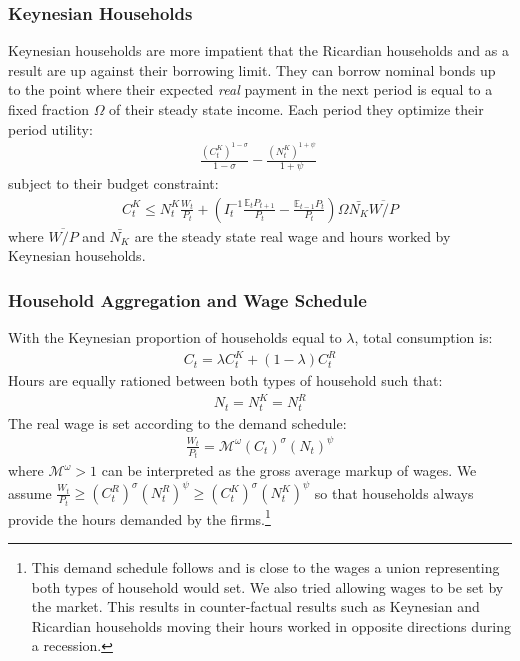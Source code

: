 \documentclass[12pt,a4paper]{article}
\begin{document}
\subsubsection{Keynesian Households}
Keynesian households are more impatient that the Ricardian households and as a result are up against their borrowing limit. They can borrow nominal bonds up to the point where their expected \textit{real} payment in the next period is equal to a fixed fraction $\Omega$ of their steady state income. Each period they optimize their period utility:
\begin{align*}
\frac{\left(C^K_t\right)^{1-\sigma}}{1-\sigma} - \frac{\left(N^K_t\right)^{1+\psi}}{1+\psi}\
\end{align*}
subject to their budget constraint:
\begin{align}
C^K_t \leq N^K_t \frac{W_t}{P_t} + \left(I_{t}^{-1} \frac{\mathbb{E}_t P_{t+1}}{P_t} -  \frac{\mathbb{E}_{t-1}P_t }{P_t}\right)\Omega \bar{N_K}\overline{W/P}  \label{budget_constraint_K}
\end{align}
where $\overline{W/P}$ and $\bar{N_K}$ are the steady state real wage and hours worked by Keynesian households.


\subsubsection{Household Aggregation and Wage Schedule}
With the Keynesian proportion of households equal to $\lambda$, total consumption is:
\begin{align}
C_t = \lambda C^K_t + (1-\lambda) C^R_t \label{agg_C}
\end{align}
Hours are equally rationed between both types of household such that:
\begin{align}
N_t = N^K_t = N^R_t	\label{agg_N}
\end{align}
The real wage is set according to the demand schedule:
\begin{align}
\frac{W_t}{P_t} = \mathcal{M}^{\omega} \left(C_t\right)^{\sigma}\left(N_t\right)^{\psi} \label{foc_hours}
\end{align}
where $\mathcal{M}^{\omega}>1$ can be interpreted as the gross average markup of wages. We assume $\frac{W_t}{P_t} \geq \left(C^R_t\right)^{\sigma}\left(N^R_t\right)^{\psi} \geq \left(C^K_t\right)^{\sigma}\left(N^K_t\right)^{\psi}$ so that households always provide the hours demanded by the firms.\footnote{This demand schedule follows \cite{dgHANKTANK} and is close to the wages a union representing both types of household would set. We also tried allowing wages to be set by the market. This results in counter-factual results such as Keynesian and Ricardian households moving their hours worked in opposite directions during a recession.}
\end{document}
